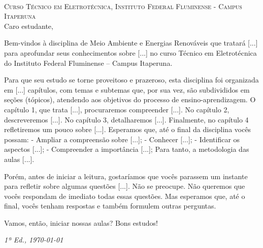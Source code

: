 
\newpage
~\vfill
\thispagestyle{empty}

\noindent \textsc{Curso Técnico em Eletrotécnica, Instituto Federal Fluminense - Campus Itaperuna}\\

\noindent 
Caro estudante,

Bem-vindos à disciplina de Meio Ambiente e Energias Renováveis que tratará [...] para aprofundar seus conhecimentos sobre [...] no curso Técnico em Eletrotécnica do Instituto Federal Fluminense – Campus Itaperuna.

Para que seu estudo se torne proveitoso e prazeroso, esta disciplina foi organizada em [...] capítulos, com temas e subtemas que, por sua vez, são subdivididos em seções (tópicos), atendendo aos objetivos do processo de ensino-aprendizagem.
O capítulo 1, que trata [...], procuraremos compreender [...].  No capítulo 2, descreveremos
[...]. No capítulo 3, detalharemos [...]. Finalmente, no capítulo 4 refletiremos um pouco sobre [...]. Esperamos que, até o final da disciplina vocês possam:
- Ampliar a compreensão sobre [...];
- Conhecer [...];
- Identificar os aspectos [...];
- Compreender a importância [...];
Para tanto, a metodologia das aulas [...].

Porém, antes de iniciar a leitura, gostaríamos que vocês parassem um instante para refletir sobre algumas questões [...].
Não se preocupe.  Não queremos que vocês respondam de imediato todas essas questões.  Mas esperamos que, até o final, vocês tenham respostas e também formulem outras perguntas.

Vamos, então, iniciar nossas aulas? Bons estudos!

\vspace{3cm}
\noindent \textit{1ª Ed., \today }
